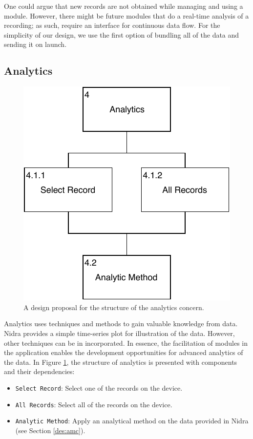 One could argue that new records are not obtained while managing and using a module. However, there might be future modules that do a real-time analysis of a recording; as such, require an interface for continuous data flow. For the simplicity of our design, we use the first option of bundling all of the data and sending it on launch.

\subsection{Analytics}\label{soc:analytics}

\begin{figure}
    \centering
    \includegraphics[scale=0.8]{images/Analytics_Design.pdf}
    \caption{A design proposal for the structure of the analytics concern.}
    \label{fig:hta_analytics}
\end{figure}

Analytics uses techniques and methods to gain valuable knowledge from data. Nidra provides a simple time-series plot for illustration of the data. However, other techniques can be in incorporated. In essence, the facilitation of modules in the application enables the development opportunities for advanced analytics of the data. In Figure \ref{fig:hta_analytics}, the structure of analytics is presented with components and their dependencies: 

\begin{itemize}
    \item[4.1.1] \verb|Select Record|: Select one of the records on the device.
    \item[4.1.2] \verb|All Records|: Select all of the records on the device.
    \item[4.2] \verb|Analytic Method|: Apply an analytical method on the data provided in Nidra (see Section \ref{des:amc}).
\end{itemize}


